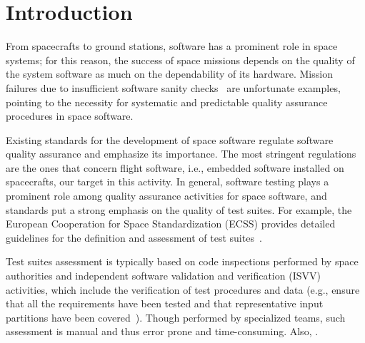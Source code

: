 
\section{Introduction}
\label{sec:introduction}


From spacecrafts to ground stations, software has a prominent role in space systems; for this reason, the success of space missions depends on the quality of the system software as much on the dependability of its hardware. Mission failures due to insufficient software sanity checks~\cite{Schiaparelli} are unfortunate examples, pointing to the necessity for systematic and predictable quality assurance procedures in space software. 


Existing standards for the development of space software regulate software quality assurance and emphasize its importance.
The most stringent regulations are the ones that concern flight software, i.e., embedded software installed on spacecrafts, our target in this activity.
In general, software testing plays a prominent role among  quality assurance activities for space software, and standards put a strong emphasis on the quality of test suites. For example, the European Cooperation for Space Standardization (ECSS) provides detailed guidelines for the definition and assessment of test suites~\cite{ecss80C,ecss40C}.

Test suites assessment
is typically based on code inspections performed by space authorities and
independent software validation and verification (ISVV) activities, which include the verification of test procedures and data (e.g., ensure that all the requirements have been tested and that representative input partitions have been covered~\cite{ISVV}). Though performed by specialized teams, such assessment is manual and thus error prone and time-consuming. 
 Also, .

